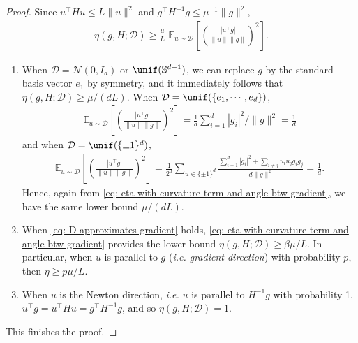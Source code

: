 \begin{proof}
    Since $u^{\top} H u \leq L\|u\|^2$ and $ g^{\top}H^{-1}g \leq \mu^{-1}\|g\|^2 $,
    \begin{align}\label{eq: eta with curvature term and angle btw gradient}
        \eta(g,H;\mathcal{D}) \geq \frac{\mu}{L} \,\, \mathbb{E}_{u\sim \mathcal{D}}\left[ \left(\frac{|{u}^\top {g}|}{\|u\|\|g\|}\right)^2 \right].
    \end{align}

    \begin{enumerate}
        \item When $\mathcal{D} = \mathcal{N}(0,I_d) $ or $\unif(\mathbb{S}^{d-1})$, we can replace $g$ by the standard basis vector $e_1$ by symmetry, and it immediately follows that $\eta(g,H;\mathcal{D}) \geq \mu/(dL)$.
              When $\mathcal{D} = \unif(\{e_1, \cdots, e_d\})$,
              \begin{align*}
                  \mathbb{E}_{u\sim \mathcal{D}}\left[ \left(\frac{|{u}^\top {g}|}{\|u\|\|g\|}\right)^2 \right]
                  = \frac{1}{d}\sum_{i=1}^{d}|g_i|^2 / \|g\|^2 = \frac{1}{d}
              \end{align*}
              and when $\mathcal{D} = \unif(\{\pm 1\}^d )$,
              \begin{align*}
                  \mathbb{E}_{u\sim \mathcal{D}}\left[ \left(\frac{|{u}^\top {g}|}{\|u\|\|g\|}\right)^2 \right]
                  = \frac{1}{2^d}\sum_{u \in \{\pm 1\}^d} \frac{\sum_{i=1}^{d}|g_i|^2 + \sum_{i\neq j}u_i u_j g_i g_j}{d \|g\|^2}
                  = \frac{1}{d}.
              \end{align*}
              Hence,  again from \eqref{eq: eta with curvature term and angle btw gradient}, we have the same lower bound $\mu/(dL)$.

        \item When \eqref{eq: D approximates gradient} holds, \eqref{eq: eta with curvature term and angle btw gradient} provides the lower bound $\eta(g,H; \mathcal{D}) \geq \beta \mu / L$.
              In particular, when $u$ is parallel to $g$ ({\em i.e. gradient direction}) with probability $p$, then $\eta \geq p\mu/L$.

        \item When $u$ is the Newton direction, {\em i.e.} $u$ is parallel to $H^{-1}g$ with probability 1, $u^{\top}g = u^{\top}Hu = g^{\top}H^{-1}g$, and so $\eta(g,H;\mathcal{D}) = 1$.
    \end{enumerate}
    This finishes the proof.
\end{proof}

